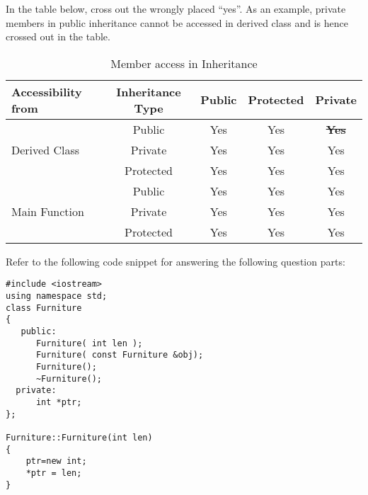 \documentclass[12pt,addpoints]{exam}
\begin{document}
\begin{questions}
\vspace{0.2in} 
\newpage
\question[15]
In the table below, cross out the wrongly placed ``yes''. As an example, private members in public inheritance cannot be accessed in derived class and is hence crossed out in the table.
\vspace{\fill}
\begin{table}[htpb] \centering
 \begin{tabular}{lcccc} \toprule
 Accessibility from  & Inheritance Type & Public  & Protected & Private\\\midrule 
\multirow{3}{*}{Derived Class} & Public & Yes & Yes & \textbf{\st{Yes}}\\
& Private & Yes & Yes & Yes\\
& Protected & Yes & Yes & Yes\\
\midrule 
\multirow{3}{*}{Main Function} & Public & Yes & Yes & Yes\\
& Private & Yes & Yes & Yes\\
& Protected & Yes & Yes & Yes\\
 \bottomrule
 \end{tabular}
 \caption{Member access in Inheritance}
 \end{table}
\vspace{\fill}
\question
Refer to the following code snippet for answering the following question parts:
\begin{lstlisting}
#include <iostream>
using namespace std;
class Furniture
{
   public:
      Furniture( int len );
      Furniture( const Furniture &obj);
      Furniture();
      ~Furniture();               
  private:
      int *ptr;
};

Furniture::Furniture(int len)
{
    ptr=new int;
    *ptr = len;
}


\end{lstlisting}
\end{questions}
\end{document}
